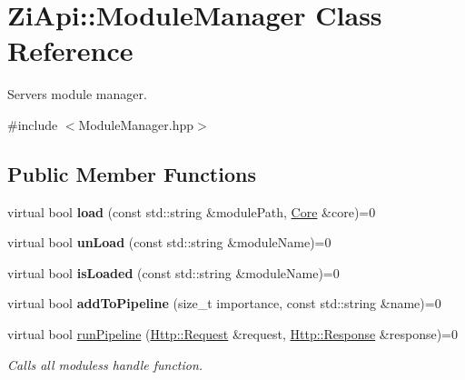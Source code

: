 \hypertarget{classZiApi_1_1ModuleManager}{}\section{Zi\+Api\+::Module\+Manager Class Reference}
\label{classZiApi_1_1ModuleManager}


Server\textquotesingle{}s module manager.  




{\ttfamily \#include $<$Module\+Manager.\+hpp$>$}

\subsection*{Public Member Functions}
\begin{DoxyCompactItemize}
\item 
\mbox{\label{classZiApi_1_1ModuleManager_a073ad69fd2dd2d4f07ed6c82fdf212e2}} 
virtual bool {\bfseries load} (const std\+::string \&module\+Path, \mbox{\hyperlink{classZiApi_1_1Core}{Core}} \&core)=0
\item 
\mbox{\label{classZiApi_1_1ModuleManager_a85b509cc930443012d901be5d4a2ad30}} 
virtual bool {\bfseries un\+Load} (const std\+::string \&module\+Name)=0
\item 
\mbox{\label{classZiApi_1_1ModuleManager_a15de426ee9f5739296a79b39a5f4abc8}} 
virtual bool {\bfseries is\+Loaded} (const std\+::string \&module\+Name)=0
\item 
\mbox{\label{classZiApi_1_1ModuleManager_a5d6dd14263be1fcfb384ddcb06dac0da}} 
virtual bool {\bfseries add\+To\+Pipeline} (size\+\_\+t importance, const std\+::string \&name)=0
\item 
virtual bool \mbox{\hyperlink{classZiApi_1_1ModuleManager_a17ad1e83dc44dc40ba8a1dc07de29063}{run\+Pipeline}} (\mbox{\hyperlink{classHttp_1_1Request}{Http\+::\+Request}} \&request, \mbox{\hyperlink{classHttp_1_1Response}{Http\+::\+Response}} \&response)=0
\begin{DoxyCompactList}\small\item\em Calls all modules\textquotesingle{}s handle function. \end{DoxyCompactList}\end{DoxyCompactItemize}
